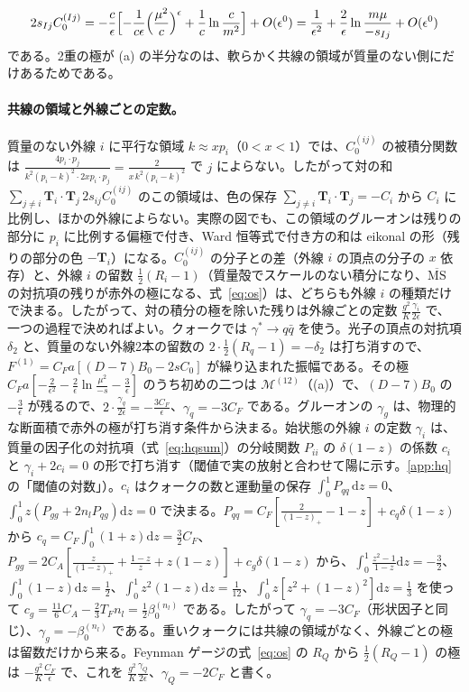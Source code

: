 \documentclass[a4paper,10pt]{ltjsarticle}
\newcommand{\dd}{\mathrm{d}}
\newcommand{\MSbar}{\overline{\mathrm{MS}}}
\begin{document}
\begin{equation*}
2s_{Ij}C_0^{(Ij)}=-\frac c\epsilon\Bigl[-\frac1{c\epsilon}\Bigl(\frac{\mu^2}c\Bigr)^\epsilon+\frac1c\ln\frac c{m^2}\Bigr]+O(\epsilon^0)=\frac1{\epsilon^2}+\frac2\epsilon\ln\frac{m\mu}{-s_{Ij}}+O(\epsilon^0)
\end{equation*}
である。2重の極が (a) の半分なのは、軟らかく共線の領域が質量のない側にだけあるためである。

\paragraph{共線の領域と外線ごとの定数。}質量のない外線 $i$ に平行な領域 $k\approx xp_i$（$0<x<1$）では、$C_0^{(ij)}$ の被積分関数は $\frac{4p_i\cdot p_j}{k^2(p_i-k)^2\cdot2xp_i\cdot p_j}=\frac2{x\,k^2(p_i-k)^2}$ で $j$ によらない。したがって対の和 $\sum_{j\ne i}\boldsymbol T_i\cdot\boldsymbol T_j\,2s_{ij}C_0^{(ij)}$ のこの領域は、色の保存 $\sum_{j\ne i}\boldsymbol T_i\cdot\boldsymbol T_j=-C_i$ から $C_i$ に比例し、ほかの外線によらない。実際の図でも、この領域のグルーオンは残りの部分に $p_i$ に比例する偏極で付き、Ward 恒等式で付き方の和は eikonal の形（残りの部分の色 $-\boldsymbol T_i$）になる。$C_0^{(ij)}$ の分子との差（外線 $i$ の頂点の分子の $x$ 依存）と、外線 $i$ の留数 $\frac12(R_i-1)$（質量殻でスケールのない積分になり、$\MSbar$ の対抗項の残りが赤外の極になる、式~\eqref{eq:os}）は、どちらも外線 $i$ の種類だけで決まる。したがって、対の積分の極を除いた残りは外線ごとの定数 $\frac{g^2}K\frac{\gamma_i}{2\epsilon}$ で、一つの過程で決めればよい。クォークでは $\gamma^*\to q\bar q$ を使う。光子の頂点の対抗項 $\delta_2$ と、質量のない外線2本の留数の $2\cdot\frac12(R_q-1)=-\delta_2$ は打ち消すので、$F^{(1)}=C_Fa[(D-7)B_0-2sC_0]$ が繰り込まれた振幅である。その極 $C_Fa[-\frac2{\epsilon^2}-\frac2\epsilon\ln\frac{\mu^2}{-s}-\frac3\epsilon]$ のうち初めの二つは $\mathcal M^{(12)}$（(a)）で、$(D-7)B_0$ の $-\frac3\epsilon$ が残るので、$2\cdot\frac{\gamma_q}{2\epsilon}=-\frac{3C_F}\epsilon$、$\gamma_q=-3C_F$ である。グルーオンの $\gamma_g$ は、物理的な断面積で赤外の極が打ち消す条件から決まる。始状態の外線 $i$ の定数 $\gamma_i$ は、質量の因子化の対抗項（式~\eqref{eq:hqsum}）の分岐関数 $P_{ii}$ の $\delta(1-z)$ の係数 $c_i$ と $\gamma_i+2c_i=0$ の形で打ち消す（閾値で実の放射と合わせて陽に示す。\ref{app:hq} の「閾値の対数」）。$c_i$ はクォークの数と運動量の保存 $\int_0^1P_{qq}\,\dd z=0$、$\int_0^1z(P_{gg}+2n_lP_{qg})\dd z=0$ で決まる。$P_{qq}=C_F[\frac2{(1-z)_+}-1-z]+c_q\delta(1-z)$ から $c_q=C_F\int_0^1(1+z)\dd z=\frac32C_F$、$P_{gg}=2C_A[\frac z{(1-z)_+}+\frac{1-z}z+z(1-z)]+c_g\delta(1-z)$ から、$\int_0^1\frac{z^2-1}{1-z}\dd z=-\frac32$、$\int_0^1(1-z)\dd z=\frac12$、$\int_0^1z^2(1-z)\dd z=\frac1{12}$、$\int_0^1z[z^2+(1-z)^2]\dd z=\frac13$ を使って $c_g=\frac{11}6C_A-\frac23T_Fn_l=\frac12\beta_0^{(n_l)}$ である。したがって $\gamma_q=-3C_F$（形状因子と同じ）、$\gamma_g=-\beta_0^{(n_l)}$ である。重いクォークには共線の領域がなく、外線ごとの極は留数だけから来る。Feynman ゲージの式~\eqref{eq:os} の $R_Q$ から $\frac12(R_Q-1)$ の極は $-\frac{g^2}K\frac{C_F}\epsilon$ で、これを $\frac{g^2}K\frac{\gamma_Q}{2\epsilon}$、$\gamma_Q=-2C_F$ と書く。
\end{document}
